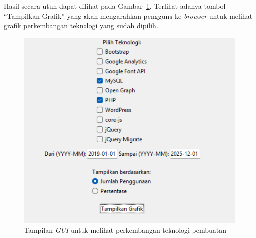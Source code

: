 Hasil secara utuh dapat dilihat pada Gambar~\ref{fig:guiutuh}. Terlihat adanya tombol ``Tampilkan Grafik'' yang akan mengarahkan pengguna ke \textit{browser} untuk melihat grafik perkembangan teknologi yang sudah dipilih.

\begin{figure}[H]
    \centering
    \includegraphics[width=0.25\linewidth]{Gambar/Guiutuh.png}
    \caption{Tampilan \textit{GUI} untuk melihat perkembangan teknologi pembuatan \web}
    \label{fig:guiutuh}
\end{figure}